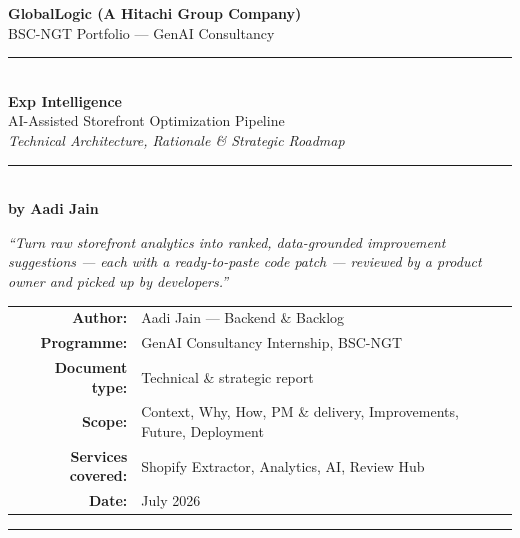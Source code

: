 \documentclass[11pt,a4paper]{article}
\begin{document}
\begin{titlepage}
\centering
\vspace*{1.4cm}
{\large\color{brandblue}\bfseries GlobalLogic \textnormal{(A Hitachi Group Company)}}\\[0.15cm]
{\small\color{brandteal} BSC-NGT Portfolio --- GenAI Consultancy}\\[0.8cm]
{\color{brandblue}\rule{\textwidth}{2pt}}\\[0.6cm]
{\Huge\bfseries\color{brandblue} Exp Intelligence}\\[0.4cm]
{\LARGE AI-Assisted Storefront Optimization Pipeline}\\[0.3cm]
{\large\itshape Technical Architecture, Rationale \& Strategic Roadmap}\\[0.4cm]
{\color{brandblue}\rule{\textwidth}{2pt}}\\[0.8cm]
{\large\bfseries by Aadi Jain}\\[1.0cm]

\begin{minipage}{0.85\textwidth}
\centering\itshape\large
``Turn raw storefront analytics into ranked, data-grounded improvement
suggestions --- each with a ready-to-paste code patch --- reviewed by a
product owner and picked up by developers.''
\end{minipage}

\vfill

\begin{tabular}{rl}
\textbf{Author:} & Aadi Jain --- Backend \& Backlog\\
\textbf{Programme:} & GenAI Consultancy Internship, BSC-NGT\\
\textbf{Document type:} & Technical \& strategic report\\
\textbf{Scope:} & Context, Why, How, PM \& delivery, Improvements, Future, Deployment\\
\textbf{Services covered:} & Shopify Extractor, Analytics, AI, Review Hub\\
\textbf{Date:} & July 2026\\
\end{tabular}

\vspace{1cm}
{\color{rulegray}\rule{\textwidth}{0.5pt}}
\end{titlepage}

\tableofcontents
\thispagestyle{fancy}
\newpage
\end{document}
